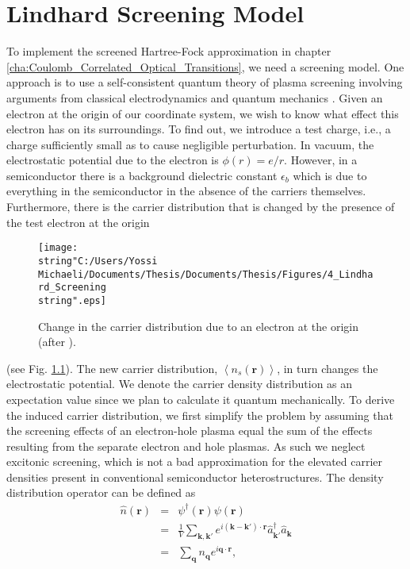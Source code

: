 %

\chapter{Lindhard Screening Model}

\label{cha:Appendix_Screening}To implement the screened Hartree-Fock
approximation in chapter \ref{cha:Coulomb_Correlated_Optical_Transitions},
we need a screening model. One approach is to use a self-consistent
quantum theory of plasma screening involving arguments from classical
electrodynamics and quantum mechanics \citet{Chow1994}. Given an
electron at the origin of our coordinate system, we wish to know what
effect this electron has on its surroundings. To find out, we introduce
a test charge, i.e., a charge sufficiently small as to cause negligible
perturbation. In vacuum, the electrostatic potential due to the electron
is $\phi(r)=e/r$. However, in a semiconductor there is a background
dielectric constant $\epsilon_{b}$ which is due to everything in
the semiconductor in the absence of the carriers themselves. Furthermore,
there is the carrier distribution that is changed by the presence
of the test electron at the origin %
\begin{figure}
\begin{centering}
\texttt{[image: \\string"C:/Users/Yossi Michaeli/Documents/Thesis/Documents/Thesis/Figures/4\_Lindhard\_Screening\\string".eps]}
\par\end{centering}

\caption{\label{fig:Lindhards_Formula_Schematic}Change in the carrier distribution
due to an electron at the origin (after \citet{Chow1994}).}

\end{figure}
 (see Fig. \ref{fig:Lindhards_Formula_Schematic}). The new carrier
distribution, $\left\langle n_{s}(\mathbf{r})\right\rangle $, in
turn changes the electrostatic potential. We denote the carrier density
distribution as an expectation value since we plan to calculate it
quantum mechanically. To derive the induced carrier distribution,
we first simplify the problem by assuming that the screening effects
of an electron-hole plasma equal the sum of the effects resulting
from the separate electron and hole plasmas. As such we neglect excitonic
screening, which is not a bad approximation for the elevated carrier
densities present in conventional semiconductor heterostructures.
The density distribution operator can be defined as \begin{eqnarray}
\hat{n}(\mathbf{r}) & = & \psi^{\dagger}(\mathbf{r})\psi(\mathbf{r})\nonumber \\
 & = & \frac{1}{V}\sum_{\mathbf{k},\mathbf{k}'}e^{i\left(\mathbf{k}-\mathbf{k}'\right)\cdot\mathbf{r}}\hat{a}_{\mathbf{k}'}^{\dagger}\hat{a}_{\mathbf{k}}\nonumber \\
 & = & \sum_{\mathbf{q}}n_{\mathbf{q}}e^{i\mathbf{q}\cdot\mathbf{r}},\label{eq:Density_Distribution_Operator}\end{eqnarray}
